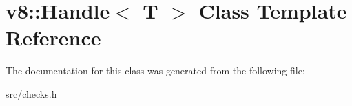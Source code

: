 \hypertarget{classv8_1_1_handle}{}\section{v8\+:\+:Handle$<$ T $>$ Class Template Reference}
\label{classv8_1_1_handle}


The documentation for this class was generated from the following file\+:\begin{DoxyCompactItemize}
\item 
src/checks.\+h\end{DoxyCompactItemize}
